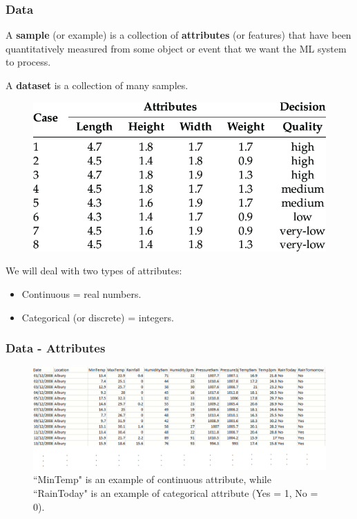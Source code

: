 \documentclass{beamer}
\begin{document}
	\begin{frame}
		\frametitle{Data}
		A \textbf{sample} (or example) is a collection of \textbf{attributes} (or features) that have been quantitatively measured from some object or event that we want the ML system to process.
		
		\vspace{5mm}
		
		
		A \textbf{dataset} is a collection of many samples.
		
		\begin{figure}
			\centering
			\includegraphics[scale=0.25]{images/data-example}
		\end{figure}
		
		
		We will deal with two types of attributes:
		
		
		\begin{itemize}
			\item Continuous = real numbers.
			\item Categorical (or discrete) = integers. 
		\end{itemize}
	\end{frame}

	\begin{frame}
		\frametitle{Data - Attributes}
		\begin{figure}
			\centering
			\includegraphics[scale=0.3]{images/data-attributes}
			\caption{``MinTemp" is an example of continuous attribute, while ``RainToday" is an example of categorical attribute (Yes = 1, No = 0).}
		\end{figure}
	\end{frame}
\end{document}
